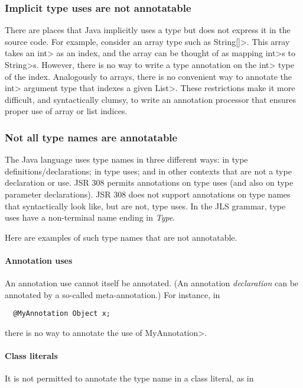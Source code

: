 \documentclass[10pt]{article}
\begin{document}
\subsubsection{Implicit type uses are not annotatable\label{implicit-type-uses}}

There are places that Java implicitly uses a type but does not express it
in the source code.  For example, consider an array type such as
\<String[]>.  This array takes an \<int> as an index, and the array can be
thought of as mapping \<int>s to \<String>s.  However, there is no way to
write a type annotation on the \<int> type of the index.  Analogously to
arrays, there is no convenient way to annotate the \<int> argument type
that indexes a given \<List>.  These restrictions make it more difficult,
and syntactically clumsy, to write an annotation processor that ensures
proper use of array or list indices.


\subsubsection{Not all type names are annotatable\label{type-names}}

The Java language uses type names in three different ways:  in type
definitions/declarations; in type uses; and in other contexts that are not
a type declaration or use.  JSR 308 permits annotations on type uses (and
also on type parameter declarations).  JSR 308 does not support annotations
on type names that syntactically look like, but are not, type uses.
In the JLS grammar, type uses have a non-terminal name ending in
\emph{Type}.

Here are examples of such type names that are not annotatable.

\paragraph{Annotation uses}
An annotation use cannot itself be annotated.  (An annotation \emph{declaration}
can be annotated by a so-called meta-annotation.)
For instance, in

\preverbnegspace
\begin{Verbatim}
  @MyAnnotation Object x;
\end{Verbatim}
\preverbnegspace

\noindent
there is no way to annotate the use of \<MyAnnotation>.

\paragraph{Class literals}
It is not permitted to annotate the type name in a class literal, as in
\end{document}
